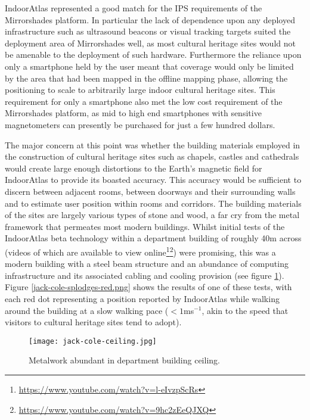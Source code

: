 IndoorAtlas represented a good match for the IPS requirements of the Mirrorshades platform. In particular the lack of dependence upon any deployed infrastructure such as ultrasound beacons or visual tracking targets suited the deployment area of Mirrorshades well, as most cultural heritage sites would not be amenable to the deployment of such hardware. Furthermore the reliance upon only a smartphone held by the user meant that coverage would only be limited by the area that had been mapped in the offline mapping phase, allowing the positioning to scale to arbitrarily large indoor cultural heritage sites. This requirement for only a smartphone also met the low cost requirement of the Mirrorshades platform, as mid to high end smartphones with sensitive magnetometers can presently be purchased for just a few hundred dollars.

The major concern at this point was whether the building materials employed in the construction of cultural heritage sites such as chapels, castles and cathedrals would create large enough distortions to the Earth's magnetic field for IndoorAtlas to provide its boasted accuracy. This accuracy would be sufficient to discern between adjacent rooms, between doorways and their surrounding walls and to estimate user position within rooms and corridors. The building materials of the sites are largely various types of stone and wood, a far cry from the metal framework that permeates most modern buildings. Whilst initial tests of the IndoorAtlas beta technology within a department building of roughly 40m across (videos of which are available to view online\footnote{\url{https://www.youtube.com/watch?v=l-eIvzpScRs}}\footnote{\url{https://www.youtube.com/watch?v=9hc2zEeQJXQ}}) were promising, this was a modern building with a steel beam structure and an abundance of computing infrastructure and its associated cabling and cooling provision (see figure \ref{jack-cole-ceiling.jpg}). Figure \ref{jack-cole-splodges-red.png} shows the results of one of these tests, with each red dot representing a position reported by IndoorAtlas while walking around the building at a slow walking pace ($<1$ms$^{-1}$, akin to the speed that visitors to cultural heritage sites tend to adopt).

\begin{figure}[h]
	\begin{center}
		\texttt{[image: jack-cole-ceiling.jpg]}
		\caption{Metalwork abundant in department building ceiling.}
		\label{jack-cole-ceiling.jpg}
	\end{center}
\end{figure}

